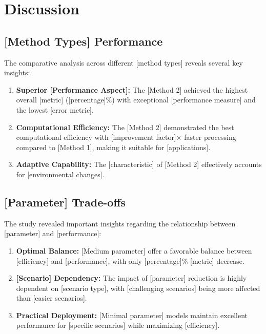 \section{Discussion}

\subsection{[Method Types] Performance}

The comparative analysis across different [method types] reveals several key insights:

\begin{enumerate}
\item \textbf{Superior [Performance Aspect]:} The [Method 2] achieved the highest overall [metric] ([percentage]\%) with exceptional [performance measure] and the lowest [error metric].

\item \textbf{Computational Efficiency:} The [Method 2] demonstrated the best computational efficiency with [improvement factor]× faster processing compared to [Method 1], making it suitable for [applications].

\item \textbf{Adaptive Capability:} The [characteristic] of [Method 2] effectively accounts for [environmental changes].
\end{enumerate}

\subsection{[Parameter] Trade-offs}

The study revealed important insights regarding the relationship between [parameter] and [performance]:

\begin{enumerate}
\item \textbf{Optimal Balance:} [Medium parameter] offer a favorable balance between [efficiency] and [performance], with only [percentage]\% [metric] decrease.

\item \textbf{[Scenario] Dependency:} The impact of [parameter] reduction is highly dependent on [scenario type], with [challenging scenarios] being more affected than [easier scenarios].

\item \textbf{Practical Deployment:} [Minimal parameter] models maintain excellent performance for [specific scenarios] while maximizing [efficiency].
\end{enumerate}

